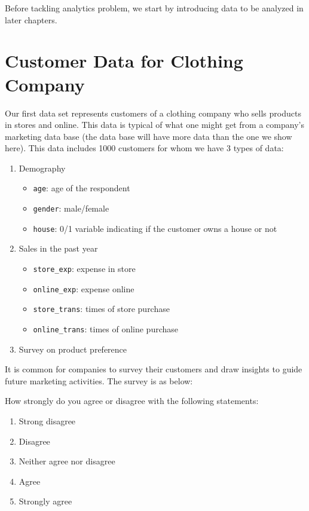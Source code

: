 \documentclass[12pt,]{krantz}
\providecommand{\tightlist}{%
  \setlength{\itemsep}{0pt}\setlength{\parskip}{0pt}}
\theoremstyle{definition}
\theoremstyle{definition}
\theoremstyle{remark}
\begin{document}
Before tackling analytics problem, we start by introducing data to be
analyzed in later chapters.

\section{Customer Data for Clothing
Company}\label{customer-data-for-clothing-company}

Our first data set represents customers of a clothing company who sells
products in stores and online. This data is typical of what one might
get from a company's marketing data base (the data base will have more
data than the one we show here). This data includes 1000 customers for
whom we have 3 types of data:

\begin{enumerate}
\def\labelenumi{\arabic{enumi}.}
\tightlist
\item
  Demography

  \begin{itemize}
  \tightlist
  \item
    \texttt{age}: age of the respondent
  \item
    \texttt{gender}: male/female
  \item
    \texttt{house}: 0/1 variable indicating if the customer owns a house
    or not
  \end{itemize}
\item
  Sales in the past year

  \begin{itemize}
  \tightlist
  \item
    \texttt{store\_exp}: expense in store
  \item
    \texttt{online\_exp}: expense online
  \item
    \texttt{store\_trans}: times of store purchase
  \item
    \texttt{online\_trans}: times of online purchase
  \end{itemize}
\item
  Survey on product preference
\end{enumerate}

It is common for companies to survey their customers and draw insights
to guide future marketing activities. The survey is as below:

How strongly do you agree or disagree with the following statements:

\begin{enumerate}
\def\labelenumi{\arabic{enumi}.}
\tightlist
\item
  Strong disagree
\item
  Disagree
\item
  Neither agree nor disagree
\item
  Agree
\item
  Strongly agree
\end{enumerate}
\end{document}
